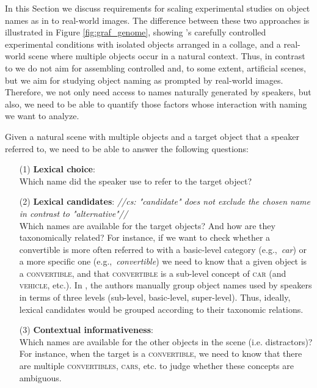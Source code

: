 \documentclass[runningheads]{llncs}
\newcommand{\cs}[1]{\textcolor{PineGreen}{\emph{//cs: #1//}}}
\newcommand{\refexp}[1]{\textsl{#1}}
\newcommand{\cat}[1]{\textsc{#1}}
\begin{document}
In this Section we discuss requirements for scaling experimental studies on object names as in \cite{graf2016animal} to real-world images.
The difference between these two approaches is illustrated in Figure \ref{fig:graf_genome}, showing  \cite{graf2016animal}'s carefully controlled experimental conditions with isolated objects arranged in a collage, and a real-world scene where multiple objects occur in a natural context.
Thus, in contrast to \cite{graf2016animal} we do not aim for assembling controlled and, to some extent, artificial scenes, but we aim for studying object naming as prompted by real-world images. Therefore, we not only need access to names naturally generated by speakers, but also, we need to be able to quantify those factors whose interaction with naming we want to analyze. 

Given a natural scene with multiple objects and a target object that a speaker referred to, we need to be able to answer the following questions:

\begin{itemize}
        \item[(1)] \textbf{Lexical choice}: \\
        Which name did the speaker use to refer to the target object?
		\item[(2)] \textbf{Lexical candidates}: \cs{"candidate" does not exclude the chosen name in contrast to "alternative"}\\
		Which names are available for the target objects? 
		And how are they taxonomically related? 
		For instance, if we want to check whether a convertible is more often referred to with a basic-level category (e.g.,~\refexp{car}) or a more specific one (e.g.,~\refexp{convertible}) we need to know that a given object is a \cat{convertible}, and that \cat{convertible} is a sub-level concept of \cat{car} (and \cat{vehicle}, etc.). 
		In \cite{graf2016animal}, the authors manually group object names used by speakers in terms of three levels (sub-level, basic-level, super-level). 
		Thus, ideally, %
		lexical candidates 
		would be grouped according to their taxonomic relations. 
		\item[(3)] \textbf{Contextual informativeness}: \\
		Which names are available for the other objects in the scene (i.e. distractors)?
		For instance, when the target is a \cat{convertible}, we need to know that there are multiple \cat{convertibles}, \cat{cars}, etc. to judge whether these concepts are ambiguous.
\end{itemize}
\end{document}
